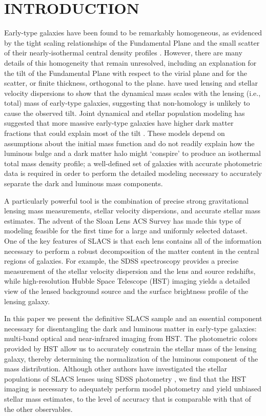 \documentclass[iop]{emulateapj}
\begin{document}
\section{INTRODUCTION}
Early-type galaxies have been found to be remarkably homogeneous, as
evidenced by the tight scaling relationships of the Fundamental Plane
\citep{fp,dressler} and the small scatter of their nearly-isothermal
central density profiles \citep[e.g.,][]{rk,rkk,paper3,koopmans09}. However,
there are many details of this homogeneity that remain unresolved, including
an explanation for the tilt of the Fundamental Plane with respect to the
virial plane and for the scatter, or finite thickness, orthogonal to the
plane. \citet{paper7} have used lensing and stellar velocity
dispersions to show that the dynamical mass scales with the lensing
(i.e., total) mass of early-type galaxies, suggesting that non-homology
is unlikely to cause the observed tilt. Joint dynamical and stellar
population modeling has suggested that more massive early-type galaxies have
higher dark matter fractions \citep[e.g.,][]{padmanabhan} that could
explain most of the tilt \citep{tortora}. These models depend on
assumptions about the initial mass function and do not readily
explain how the luminous bulge and a dark matter halo might `conspire'
to produce an isothermal total mass density profile; a well-defined
set of galaxies with accurate photometric data is required in order
to perform the detailed modeling necessary to accurately separate
the dark and luminous mass components.

A particularly powerful tool is the
combination of precise strong gravitational lensing mass measurements,
stellar velocity dispersions, and accurate stellar mass estimates.
The advent of the Sloan Lens ACS Survey \citep[SLACS;][papers I-VIII,
respectively]{paper1,paper2,paper3,paper4,paper5,paper6,paper7,paper8}
has made this type of modeling feasible for the first time for a large
and uniformly selected dataset. One of the key features of SLACS is
that each lens contains all of the information necessary to perform a
robust decomposition of the matter content in the central regions of
galaxies. For example, the SDSS spectroscopy provides a precise
measurement of the stellar velocity dispersion and the lens and source
redshifts, while high-resolution Hubble Space Telescope (HST) imaging
yields a detailed view of the lensed background source and the surface brightness profile of the lensing galaxy.

In this paper we present the definitive SLACS sample and an essential
component necessary for disentangling the dark and luminous matter in
early-type galaxies: multi-band optical and near-infrared imaging from
HST. The photometric colors provided by HST allow us to accurately
constrain the stellar mass of the lensing galaxy, thereby determining
the normalization of the luminous component of the mass
distribution. Although other authors have investigated the stellar
populations of SLACS lenses using SDSS photometry \citep[][hereafter
G09]{grillo,grillo09}, we find that the HST imaging is necessary to
adequately perform model photometry and yield unbiased stellar mass
estimates, to the level of accuracy that is comparable with that of
the other observables.
\end{document}
